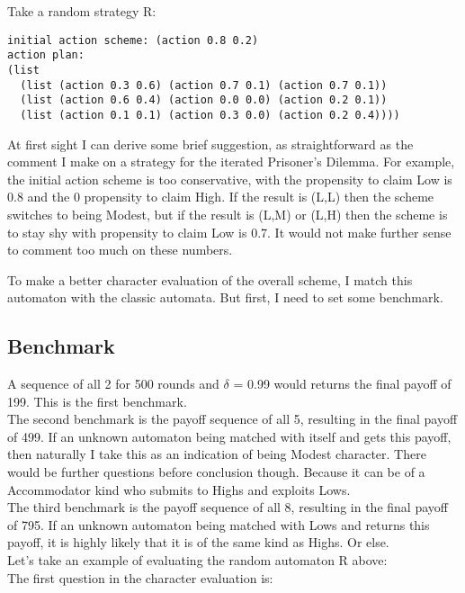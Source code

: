 \documentclass[12.5pt]{report}
\begin{document}
Take a random strategy R:

\begin{verbatim}
initial action scheme: (action 0.8 0.2)
action plan:
(list
  (list (action 0.3 0.6) (action 0.7 0.1) (action 0.7 0.1))
  (list (action 0.6 0.4) (action 0.0 0.0) (action 0.2 0.1))
  (list (action 0.1 0.1) (action 0.3 0.0) (action 0.2 0.4))))

\end{verbatim}

At first sight I can derive some brief suggestion, as straightforward as the comment I make on a strategy for the iterated Prisoner's Dilemma. For example, the initial action scheme is too conservative, with the propensity to claim Low is 0.8 and the 0 propensity to claim High. If the result is (L,L) then the scheme switches to being Modest, but if the result is (L,M) or (L,H) then the scheme is to stay shy with propensity to claim Low is 0.7. It would not make further sense to comment too much on these numbers.

To make a better character evaluation of the overall scheme, I match this automaton with the classic automata. But first, I need to set some benchmark.

\subsection{Benchmark}

A sequence of all 2 for 500 rounds and $\delta$ = 0.99 would returns the final payoff of 199. This is the first benchmark.\\

The second benchmark is the payoff sequence of all 5, resulting in the final payoff of 499. If an unknown automaton being matched with itself and gets this payoff, then naturally I take this as an indication of being Modest character. There would be further questions before conclusion though. Because it can be of a Accommodator kind who submits to Highs and exploits Lows.\\

The third benchmark is the payoff sequence of all 8, resulting in the final payoff of 795. If an unknown automaton being matched with Lows and returns this payoff, it is highly likely that it is of the same kind as Highs. Or else.\\

Let's take an example of evaluating the random automaton R above: \\
The first question in the character evaluation is: \\
\end{document}
